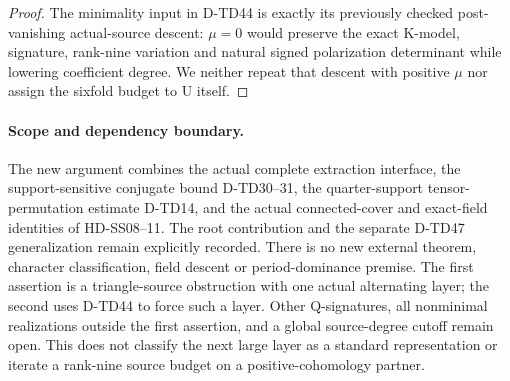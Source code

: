 \begin{proof}
The minimality input in D-TD44 is exactly its previously checked
post-vanishing actual-source descent: \(\mu=0\) would preserve
the exact K-model, signature, rank-nine variation and natural
signed polarization determinant while lowering coefficient
degree. We neither repeat that descent with positive \(\mu\)
nor assign the sixfold budget to U itself.
\end{proof}

\paragraph{Scope and dependency boundary.}
The new argument combines the actual complete extraction interface,
the support-sensitive conjugate bound D-TD30--31, the quarter-support
tensor-permutation estimate D-TD14, and the actual connected-cover
and exact-field identities of HD-SS08--11. The root contribution
and the separate D-TD47 generalization remain explicitly recorded.
There is no new external theorem, character classification, field
descent or period-dominance premise. The first assertion is a
triangle-source obstruction with one actual alternating layer;
the second uses D-TD44 to force such a layer. Other Q-signatures,
all nonminimal realizations outside the first assertion, and a
global source-degree cutoff remain open. This does not classify
the next large layer as a standard representation or iterate a
rank-nine source budget on a positive-cohomology partner.
